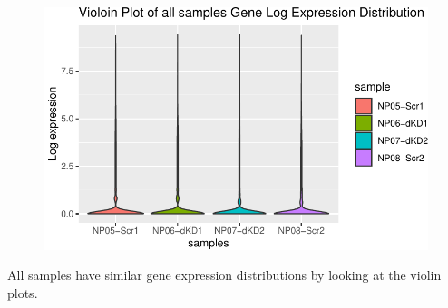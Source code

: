 \documentclass[
  letterpaper,
  DIV=11,
  numbers=noendperiod]{scrartcl}
\begin{document}
\begin{figure}[H]

{\centering \includegraphics{intro-STAT-GroupProject_files/figure-pdf/unnamed-chunk-6-1.pdf}

}

\end{figure}

All samples have similar gene expression distributions by looking at the
violin plots.
\end{document}

